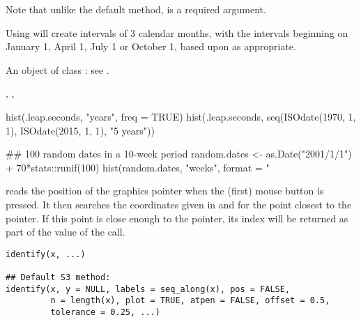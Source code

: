 %
\begin{Details}\relax
Note that unlike the default method,  is a required argument.

Using  will create intervals of 3 calendar
months, with the intervals beginning on January 1, April 1,
July 1 or October 1, based upon  as appropriate.
\end{Details}
%
\begin{Value}
An object of class : see .
\end{Value}
%
\begin{SeeAlso}\relax
{}, , 
\end{SeeAlso}
%
\begin{Examples}
\begin{ExampleCode}
hist(.leap.seconds, "years", freq = TRUE)
hist(.leap.seconds,
     seq(ISOdate(1970, 1, 1), ISOdate(2015, 1, 1), "5 years"))

## 100 random dates in a 10-week period
random.dates <- as.Date("2001/1/1") + 70*stats::runif(100)
hist(random.dates, "weeks", format = "%
\end{ExampleCode}
\end{Examples}
%
\begin{Description}\relax
{} reads the position of the graphics pointer when the
(first) mouse button is pressed.  It then searches the coordinates
given in  and  for the point closest to the pointer.
If this point is close enough to the pointer, its index will be returned as
part of the value of the call.
\end{Description}
%
\begin{Usage}
\begin{verbatim}
identify(x, ...)

## Default S3 method:
identify(x, y = NULL, labels = seq_along(x), pos = FALSE,
         n = length(x), plot = TRUE, atpen = FALSE, offset = 0.5,
         tolerance = 0.25, ...)
\end{verbatim}
\end{Usage}
%
